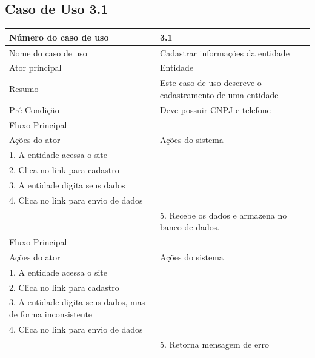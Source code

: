   \subsection{Caso de Uso 3.1}
    \begin{table}[h]
    \begin{center}
    \begin{tabular}{|p{5cm}|p{10cm}|}
      \hline
      Número do caso de uso & 3.1\\
      \hline
      Nome do caso de uso & Cadastrar informações da entidade\\
      \hline
      Ator principal & Entidade\\
      \hline
      Resumo & Este caso de uso descreve o cadastramento de uma entidade\\
      \hline
      Pré-Condição & Deve possuir CNPJ e telefone\\
      \hline
      Fluxo Principal \\
      \hline
      Ações do ator & Ações do sistema\\
      \hline
      1. A entidade acessa o site & \\
      \hline   
      2. Clica no link para cadastro & \\
      \hline
      3. A entidade digita seus dados & \\
      \hline
      4. Clica no link para envio de dados & \\
      \hline
      & 5. Recebe os dados e armazena no banco de dados.\\
      \hline
      Fluxo Principal       & \\
      \hline
      Ações do ator         & Ações do sistema \\
      \hline
      1. A entidade acessa o site & \\
      \hline   
      2. Clica no link para cadastro & \\
      \hline
      3. A entidade digita seus dados, mas de forma inconsistente & \\
      \hline
      4. Clica no link para envio de dados & \\
      \hline
      & 5. Retorna mensagem de erro\\
      \hline
    \end{tabular}
    \end{center}
    \end{table}
\newpage

